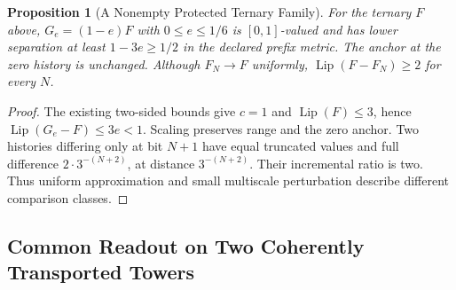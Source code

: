 \documentclass[11pt,a4paper]{article}
\theoremstyle{plain}
\newtheorem{proposition}[theorem]{Proposition}
\theoremstyle{definition}
\theoremstyle{remark}
\begin{document}
\begin{proposition}[A Nonempty Protected Ternary Family]\label{prop:protected-ternary-family}
For the ternary $F$ above, $G_e=(1-e)F$ with $0\le e\le1/6$ is $[0,1]$-valued and has lower separation at least $1-3e\ge1/2$ in the declared prefix metric. The anchor at the zero history is unchanged. Although $F_N\to F$ uniformly, $\operatorname{Lip}(F-F_N)\ge2$ for every $N$.
\end{proposition}
\begin{proof}
The existing two-sided bounds give $c=1$ and $\operatorname{Lip}(F)\le3$, hence $\operatorname{Lip}(G_e-F)\le3e<1$. Scaling preserves range and the zero anchor. Two histories differing only at bit $N+1$ have equal truncated values and full difference $2\cdot3^{-(N+2)}$, at distance $3^{-(N+2)}$. Their incremental ratio is two. Thus uniform approximation and small multiscale perturbation describe different comparison classes.
\end{proof}

\subsection{Common Readout on Two Coherently Transported Towers}
\end{document}
